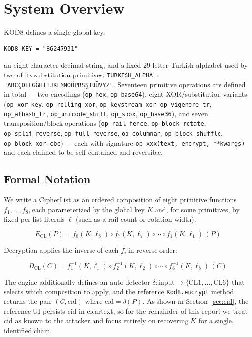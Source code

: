 \documentclass[11pt]{article}
\begin{document}
\section{System Overview}

KOD8 defines a single global key,

\begin{lstlisting}
KOD8_KEY = "86247931"
\end{lstlisting}

\sloppy
\noindent
an eight-character decimal string, and a fixed 29-letter Turkish
alphabet used by two of its substitution primitives:
\texttt{TURKISH\_ALPHA = "ABCÇDEFGĞHİIJKLMNOÖPRSŞTUÜVYZ"}. Seventeen
primitive operations are defined in total --- two encodings
(\texttt{op\_hex}, \texttt{op\_base64}), eight XOR/substitution
variants (\texttt{op\_xor\_key}, \texttt{op\_rolling\_xor},
\texttt{op\_keystream\_xor}, \texttt{op\_vigenere\_tr},
\texttt{op\_atbash\_tr}, \texttt{op\_unicode\_shift}, \texttt{op\_sbox},
\texttt{op\_base36}), and seven transposition/block operations
(\texttt{op\_rail\_fence}, \texttt{op\_block\_rotate},
\texttt{op\_split\_reverse}, \texttt{op\_full\_reverse},
\texttt{op\_columnar}, \texttt{op\_block\_shuffle},
\texttt{op\_block\_xor\_cbc}) --- each with signature
\texttt{op\_xxx(text, encrypt, **kwargs)} and each claimed to be
self-contained and reversible.
\fussy

\subsection{Formal Notation}

We write a CipherList as an ordered composition of eight primitive
functions $f_1, \dots, f_8$, each parameterized by the global key $K$
and, for some primitives, by fixed per-list literals $\ell$ (such as a
rail count or rotation width):

\[
  E_{\text{CL}}(P) = f_8(K,\ell_8) \circ f_7(K,\ell_7) \circ \cdots \circ f_1(K,\ell_1)\,(P)
\]

Decryption applies the inverse of each $f_i$ in reverse order:

\[
  D_{\text{CL}}(C) = f_1^{-1}(K,\ell_1) \circ f_2^{-1}(K,\ell_2) \circ \cdots \circ f_8^{-1}(K,\ell_8)\,(C)
\]

The engine additionally defines an auto-detector
$\delta: \text{input} \to \{\text{CL1},\dots,\text{CL6}\}$ that selects
which composition to apply, and the reference \texttt{Kod8.encrypt}
method returns the pair $(C, \text{cid})$ where $\text{cid} = \delta(P)$.
As shown in Section~\ref{sec:cid}, the reference UI persists
$\text{cid}$ in cleartext, so for the remainder of this report we treat
$\text{cid}$ as known to the attacker and focus entirely on recovering
$K$ for a single, identified chain.
\end{document}
